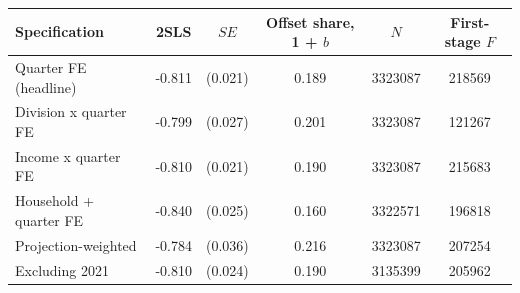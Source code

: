 \setlength{\tabcolsep}{4pt}
\begin{tabular}{
    l
    S[table-format=-1.3, table-space-text-post=\sym{***}, table-align-text-after=false]
    S[table-format=1.3, table-space-text-pre={(}, table-align-text-before=false, table-space-text-post={)}, table-align-text-after=false]
    S[table-format=1.3]
    S[table-format=9]
    S[table-format=7]
}
\toprule
Specification & {2SLS} & {\(\mathit{SE}\)} & {Offset share, 1 + \(b\)} & {\(N\)} & {First-stage \(F\)} \\
\midrule
Quarter FE (headline) & -0.811\sym{***} & {(}0.021{)} & 0.189 & 3323087 & 218569 \\
Division x quarter FE & -0.799\sym{***} & {(}0.027{)} & 0.201 & 3323087 & 121267 \\
Income x quarter FE & -0.810\sym{***} & {(}0.021{)} & 0.190 & 3323087 & 215683 \\
Household + quarter FE & -0.840\sym{***} & {(}0.025{)} & 0.160 & 3322571 & 196818 \\
Projection-weighted & -0.784\sym{***} & {(}0.036{)} & 0.216 & 3323087 & 207254 \\
Excluding 2021 & -0.810\sym{***} & {(}0.024{)} & 0.190 & 3135399 & 205962 \\
\bottomrule
\end{tabular}
